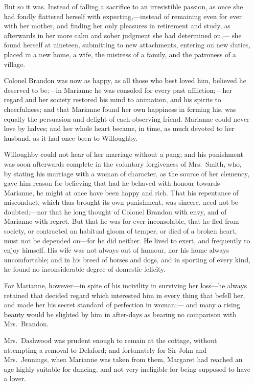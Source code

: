 But so it was.  Instead of falling a sacrifice
to an irresistible passion, as once she had fondly
flattered herself with expecting,---instead of remaining
even for ever with her mother, and finding her only
pleasures in retirement and study, as afterwards in her
more calm and sober judgment she had determined on,---%
she found herself at nineteen, submitting to new attachments,
entering on new duties, placed in a new home, a wife,
the mistress of a family, and the patroness of a village.

Colonel Brandon was now as happy, as all those who best
loved him, believed he deserved to be;---in Marianne he
was consoled for every past affliction;---her regard and her
society restored his mind to animation, and his spirits
to cheerfulness; and that Marianne found her own happiness
in forming his, was equally the persuasion and delight
of each observing friend.  Marianne could never love
by halves; and her whole heart became, in time, as much
devoted to her husband, as it had once been to Willoughby.

Willoughby could not hear of her marriage without
a pang; and his punishment was soon afterwards complete
in the voluntary forgiveness of Mrs.\ Smith, who, by stating
his marriage with a woman of character, as the source
of her clemency, gave him reason for believing that had he
behaved with honour towards Marianne, he might at once have
been happy and rich.  That his repentance of misconduct,
which thus brought its own punishment, was sincere,
need not be doubted;---nor that he long thought of Colonel
Brandon with envy, and of Marianne with regret.  But that
he was for ever inconsolable, that he fled from society,
or contracted an habitual gloom of temper, or died of a
broken heart, must not be depended on---for he did neither.
He lived to exert, and frequently to enjoy himself.
His wife was not always out of humour, nor his home
always uncomfortable; and in his breed of horses and dogs,
and in sporting of every kind, he found no inconsiderable
degree of domestic felicity.

For Marianne, however---in spite of his incivility
in surviving her loss---he always retained that decided
regard which interested him in every thing that befell her,
and made her his secret standard of perfection in woman;---%
and many a rising beauty would be slighted by him in
after-days as bearing no comparison with Mrs.\ Brandon.

Mrs.\ Dashwood was prudent enough to remain at the cottage,
without attempting a removal to Delaford; and fortunately for
Sir John and Mrs.\ Jennings, when Marianne was taken from them,
Margaret had reached an age highly suitable for dancing,
and not very ineligible for being supposed to have a lover.


